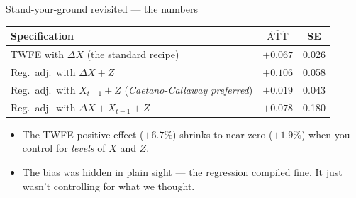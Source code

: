 \documentclass[aspectratio=169,11pt]{beamer}
\begin{document}
\begin{frame}{Stand-your-ground revisited --- the numbers}
\vspace{0.5em}
\begin{center}
\renewcommand{\arraystretch}{1.4}
\footnotesize
\begin{tabular}{@{}lcc@{}}
\toprule
\textbf{Specification}                                & \textbf{$\widehat{\text{ATT}}$} & \textbf{SE} \\
\midrule
TWFE with $\Delta X$ (the standard recipe)            & $+0.067$               & 0.026       \\
Reg.\ adj.\ with $\Delta X + Z$                        & $+0.106$               & 0.058       \\
\rowcolor{remixgreenlight}
Reg.\ adj.\ with $X_{t-1} + Z$ \;(\textit{Caetano-Callaway preferred}) & $+0.019$ & 0.043 \\
Reg.\ adj.\ with $\Delta X + X_{t-1} + Z$              & $+0.078$               & 0.180       \\
\bottomrule
\end{tabular}
\end{center}
\vspace{0.6em}
\begin{itemize}\small
  \item The TWFE positive effect ($+6.7\%$) shrinks to near-zero ($+1.9\%$) when you control for \textit{levels} of $X$ and $Z$.
  \item The bias was hidden in plain sight --- the regression compiled fine. It just wasn't controlling for what we thought.
\end{itemize}
\end{frame}


\end{document}
